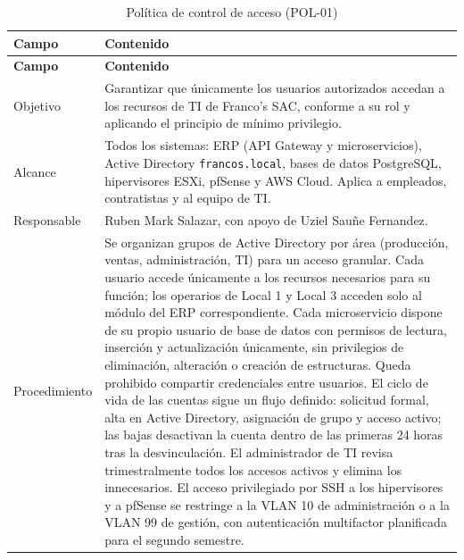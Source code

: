 \documentclass[11pt, a4paper, oneside]{report}
\begin{document}
\renewcommand{\arraystretch}{1.3}
\footnotesize
{}

\begin{xltabular}{\textwidth}{@{}|L{2.6cm}|X|@{}}
\caption{Política de control de acceso (POL-01)}
\label{tab:pol01_control_acceso} \\

\parbox[c][1.1cm][c]{\linewidth}{\centering\color{white}\bfseries\small Campo} &
\parbox[c][1.1cm][c]{\linewidth}{\centering\color{white}\bfseries\small Contenido} \\ \hline
\endfirsthead

\parbox[c][1.1cm][c]{\linewidth}{\centering\color{white}\bfseries\small Campo} &
\parbox[c][1.1cm][c]{\linewidth}{\centering\color{white}\bfseries\small Contenido} \\ \hline
\endhead

\hline
\endfoot

{\small Objetivo} & {\small Garantizar que únicamente los usuarios autorizados accedan a los recursos de TI de Franco's SAC, conforme a su rol y aplicando el principio de mínimo privilegio.} \\ \hline

{\small Alcance} & {\small Todos los sistemas: ERP (API Gateway y microservicios), Active Directory \texttt{francos.local}, bases de datos PostgreSQL, hipervisores ESXi, pfSense y AWS Cloud. Aplica a empleados, contratistas y al equipo de TI.} \\ \hline

{\small Responsable} & {\small Ruben Mark Salazar, con apoyo de Uziel Sauñe Fernandez.} \\ \hline

{\small Procedimiento} & {\small Se organizan grupos de Active Directory por área (producción, ventas, administración, TI) para un acceso granular. Cada usuario accede únicamente a los recursos necesarios para su función; los operarios de Local 1 y Local 3 acceden solo al módulo del ERP correspondiente. Cada microservicio dispone de su propio usuario de base de datos con permisos de lectura, inserción y actualización únicamente, sin privilegios de eliminación, alteración o creación de estructuras. Queda prohibido compartir credenciales entre usuarios. El ciclo de vida de las cuentas sigue un flujo definido: solicitud formal, alta en Active Directory, asignación de grupo y acceso activo; las bajas desactivan la cuenta dentro de las primeras 24 horas tras la desvinculación. El administrador de TI revisa trimestralmente todos los accesos activos y elimina los innecesarios. El acceso privilegiado por SSH a los hipervisores y a pfSense se restringe a la VLAN 10 de administración o a la VLAN 99 de gestión, con autenticación multifactor planificada para el segundo semestre.} \\ \hline


\end{xltabular}
\end{document}
